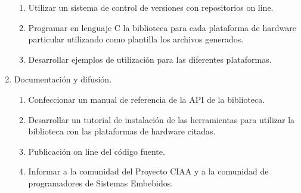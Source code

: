 \begin{enumerate}
\begin{enumerate}
\item Utilizar un sistema de control de versiones con repositorios on line.
\item Programar en lenguaje C la biblioteca para cada plataforma de hardware particular utilizando como plantilla los archivos generados.
\item Desarrollar ejemplos de utilización para las diferentes plataformas.
\end{enumerate}
\item Documentación y difusión.
\begin{enumerate}
\item Confeccionar un manual de referencia de la API de la biblioteca.
\item Desarrollar un tutorial de instalación de las herramientas para utilizar la biblioteca con las plataformas de hardware citadas.
\item Publicación on line del código fuente.
\item Informar a la comunidad del Proyecto CIAA y a la comunidad de programadores de Sistemas Embebidos.
\end{enumerate}
\end{enumerate}

% 
% 

